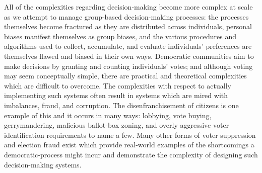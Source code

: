 %
%

All of the complexities regarding decision-making become more complex at scale
as we attempt to manage group-based decision-making processes: the processes
themselves become fractured as they are distributed across individuals, personal
biases manifest themselves as group biases, and the various procedures and
algorithms used to collect, accumulate, and evaluate individuals' preferences
are themselves flawed and biased in their own ways.\cite{electoral-handbook}
Democratic communities aim to make decisions by granting and counting
individuals' votes; and although voting may seem conceptually simple, there are
practical and theoretical complexities which are difficult to overcome. The
complexities with respect to actually implementing such systems often result in
systems which are mired with imbalances, fraud, and corruption. The
disenfranchisement of citizens is one example of this and it occurs in many
ways: lobbying, vote buying, gerrymandering, malicious ballot-box zoning, and
overly aggressive voter identification requirements to name a few. Many other
forms of voter suppression and election fraud exist which provide real-world
examples of the shortcomings a democratic-process might incur and demonstrate
the complexity of designing such decision-making
systems.\cite{steal-this-vote,electoral-handbook,confidence-electoral-process}

